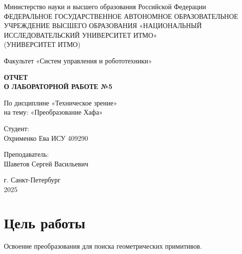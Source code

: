 \documentclass[a4paper,12pt]{article}
\begin{document}
	\begin{titlepage}
		\centering
		\vspace*{1cm}
		
		{\large Министерство науки и высшего образования Российской Федерации}\\
		{\large ФЕДЕРАЛЬНОЕ ГОСУДАРСТВЕННОЕ АВТОНОМНОЕ ОБРАЗОВАТЕЛЬНОЕ УЧРЕЖДЕНИЕ ВЫСШЕГО ОБРАЗОВАНИЯ «НАЦИОНАЛЬНЫЙ ИССЛЕДОВАТЕЛЬСКИЙ УНИВЕРСИТЕТ ИТМО»}\\
		{\large (УНИВЕРСИТЕТ ИТМО)}\\
		
		\vspace{2cm}
		
		{\large Факультет «Систем управления и робототехники»}\\
		
		\vspace{3cm}
		
		\textbf{{\Huge ОТЧЕТ}\\
			{\Huge О ЛАБОРАТОРНОЙ РАБОТЕ №5}}\\
		
		\vspace{1cm}
		
		{\LARGE По дисциплине «Техническое зрение»}\\
		{\LARGE на тему: «Преобразование Хафа»}\\
		
		\vspace{2cm}
		
		{\Large Студент:}\\
		Охрименко Ева ИСУ 409290\\
		
		\vspace{2cm}
		
		{\Large Преподаватель:}\\
		Шаветов Сергей Васильевич\\
		
		\vspace{4cm}
		
		{\large г. Санкт-Петербург}\\
		{\large 2025}
		
	\end{titlepage} 
	
	\tableofcontents  %
	\newpage
	
	\section{Цель работы}
	Освоение преобразования для поиска геометрических примитивов.
	
\end{document}
